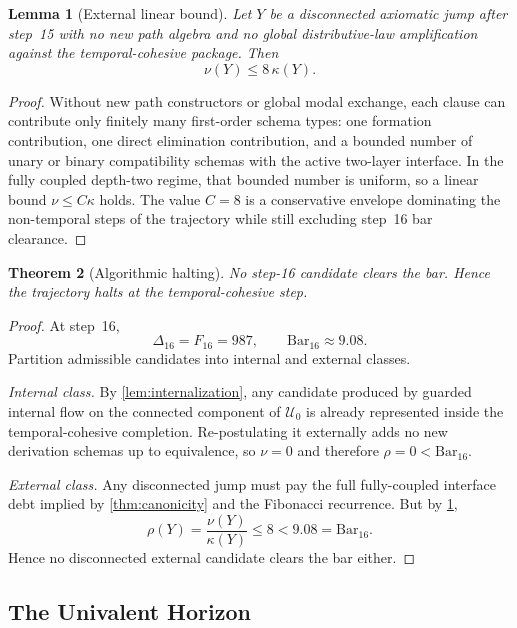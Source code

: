 \documentclass[11pt,a4paper]{article}
\theoremstyle{plain}
\newtheorem{theorem}{Theorem}[section]
\newtheorem{lemma}[theorem]{Lemma}
\theoremstyle{definition}
\theoremstyle{remark}
\newcommand{\U}{\mathcal{U}}
\newcommand{\SelBar}{\mathrm{Bar}}
\begin{document}
\begin{lemma}[External linear bound]
\label{lem:external-bound}
Let $Y$ be a disconnected axiomatic jump after step~15 with no new path algebra and no global distributive-law amplification against the temporal-cohesive package.  Then
\[
  \nu(Y)\le 8\,\kappa(Y).
\]
\end{lemma}

\begin{proof}
Without new path constructors or global modal exchange, each clause can contribute only finitely many first-order schema types: one formation contribution, one direct elimination contribution, and a bounded number of unary or binary compatibility schemas with the active two-layer interface.  In the fully coupled depth-two regime, that bounded number is uniform, so a linear bound $\nu\le C\kappa$ holds.  The value $C=8$ is a conservative envelope dominating the non-temporal steps of the trajectory while still excluding step~16 bar clearance.
\end{proof}

\begin{theorem}[Algorithmic halting]
\label{thm:halting}
No step-16 candidate clears the bar.  Hence the trajectory halts at the temporal-cohesive step.
\end{theorem}

\begin{proof}
At step~16,
\[
  \Delta_{16}=F_{16}=987,
  \qquad
  \SelBar_{16}\approx 9.08.
\]
Partition admissible candidates into internal and external classes.

\emph{Internal class.}
By \cref{lem:internalization}, any candidate produced by guarded internal flow on the connected component of $\U_0$ is already represented inside the temporal-cohesive completion.  Re-postulating it externally adds no new derivation schemas up to equivalence, so $\nu=0$ and therefore $\rho=0<\SelBar_{16}$.

\emph{External class.}
Any disconnected jump must pay the full fully-coupled interface debt implied by \cref{thm:canonicity} and the Fibonacci recurrence.  But by \cref{lem:external-bound},
\[
  \rho(Y)=\frac{\nu(Y)}{\kappa(Y)}\le 8<9.08=\SelBar_{16}.
\]
Hence no disconnected external candidate clears the bar either.
\end{proof}

\subsection{The Univalent Horizon}
\end{document}
